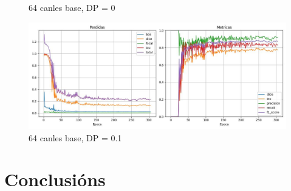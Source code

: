 \documentclass{article}
\begin{document}
\begin{itemize}
\begin{figure}[htbp]
\begin{minipage}{0.48\textwidth}
	\caption*{64 canles base, DP = 0}
    \end{minipage}
    \hfill
    \begin{minipage}{0.48\textwidth}
    \centering
        \includegraphics[width=\linewidth]{figuras/64D.jpg}
	\caption*{64 canles base, DP = 0.1}
    \end{minipage}
    \label{fig:five-images}
\end{figure}


\end{itemize}


\section{Conclusións}

\newpage



\end{document}
